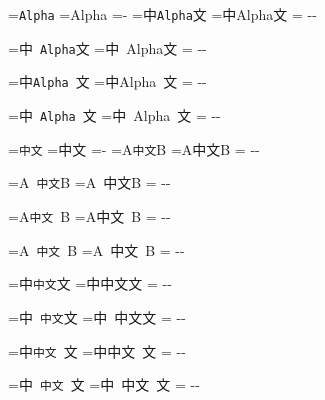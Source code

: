 \documentclass{article}
\newcommand\Report[2]{%
  \BoundaryDelta=\dimexpr
    \wd\CandContext-\wd\RawContext-\IntrinsicDelta\relax
  \ifdim\BoundaryDelta<0pt \BoundaryDelta=-\BoundaryDelta\fi
  \ifdim\BoundaryDelta<0.01pt
    \typeout{MATRIX|#1|#2|PASS|delta=\the\BoundaryDelta}%
  \else
    \typeout{MATRIX|#1|#2|FAIL|delta=\the\BoundaryDelta}%
  \fi
}
\begin{document}
\MatrixReset\setbox\CandStandalone=\hbox{\verb|Alpha|}
\MatrixReset\setbox\RawStandalone=\hbox{Alpha}
\IntrinsicDelta=\dimexpr\wd\CandStandalone-\wd\RawStandalone\relax
\MatrixReset\setbox\CandContext=\hbox{中\verb|Alpha|文}
\MatrixReset\setbox\RawContext=\hbox{中Alpha文}
\Report{verb/W/CWC}{00}
\MatrixReset\setbox\CandContext=\hbox{中 \verb|Alpha|文}
\MatrixReset\setbox\RawContext=\hbox{中 Alpha文}
\Report{verb/W/CWC}{10}
\MatrixReset\setbox\CandContext=\hbox{中\verb|Alpha| 文}
\MatrixReset\setbox\RawContext=\hbox{中Alpha 文}
\Report{verb/W/CWC}{01}
\MatrixReset\setbox\CandContext=\hbox{中 \verb|Alpha| 文}
\MatrixReset\setbox\RawContext=\hbox{中 Alpha 文}
\Report{verb/W/CWC}{11}

\MatrixReset\setbox\CandStandalone=\hbox{\verb|中文|}
\MatrixReset\setbox\RawStandalone=\hbox{中文}
\IntrinsicDelta=\dimexpr\wd\CandStandalone-\wd\RawStandalone\relax
\MatrixReset\setbox\CandContext=\hbox{A\verb|中文|B}
\MatrixReset\setbox\RawContext=\hbox{A中文B}
\Report{verb/C/WCW}{00}
\MatrixReset\setbox\CandContext=\hbox{A \verb|中文|B}
\MatrixReset\setbox\RawContext=\hbox{A 中文B}
\Report{verb/C/WCW}{10}
\MatrixReset\setbox\CandContext=\hbox{A\verb|中文| B}
\MatrixReset\setbox\RawContext=\hbox{A中文 B}
\Report{verb/C/WCW}{01}
\MatrixReset\setbox\CandContext=\hbox{A \verb|中文| B}
\MatrixReset\setbox\RawContext=\hbox{A 中文 B}
\Report{verb/C/WCW}{11}

\MatrixReset\setbox\CandContext=\hbox{中\verb|中文|文}
\MatrixReset\setbox\RawContext=\hbox{中中文文}
\Report{verb/C/CCC}{00}
\MatrixReset\setbox\CandContext=\hbox{中 \verb|中文|文}
\MatrixReset\setbox\RawContext=\hbox{中 中文文}
\Report{verb/C/CCC}{10}
\MatrixReset\setbox\CandContext=\hbox{中\verb|中文| 文}
\MatrixReset\setbox\RawContext=\hbox{中中文 文}
\Report{verb/C/CCC}{01}
\MatrixReset\setbox\CandContext=\hbox{中 \verb|中文| 文}
\MatrixReset\setbox\RawContext=\hbox{中 中文 文}
\Report{verb/C/CCC}{11}
\end{document}
